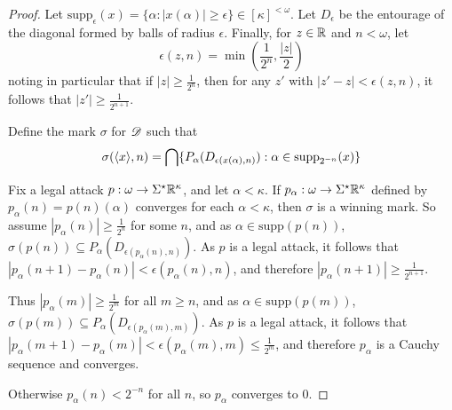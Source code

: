 \documentclass[11pt]{article}
\begin{document}
  \begin{proof}
    Let
    $
      \text{supp}_\epsilon(x)
        =
      \{\alpha:|x(\alpha)|\geq \epsilon\}
        \in
      [\kappa]^{<\omega}
    $. Let $D_\epsilon$ be the entourage of the diagonal formed by
    balls of radius $\epsilon$. Finally, for $z\in\mathbb{R}$
    and $n<\omega$, let
      \[
        \epsilon(z,n)
          =
        \min\left(
          \frac{1}{2^n},
          \frac{|z|}{2}
        \right)
      \]
    noting in particular that if $|z|\geq\frac{1}{2^n}$, then for any $z'$ with
    $|z'-z|<\epsilon(z,n)$, it follows that $|z'|\geq\frac{1}{2^{n+1}}$.

    Define the mark $\sigma$ for $\mathscr{D}$ such that
      \[
        \sigma(\langle x\rangle,n)
          =
        \bigcap\{
          P_\alpha(D_{\epsilon(x(\alpha),n)})
        :
          \alpha\in\text{supp}_{2^{-n}}(x)
        \}
      \]

    Fix a legal attack $p:\omega\to\Sigma^\star\mathbb{R}^{\kappa}$, and let
    $\alpha<\kappa$. If $p_\alpha:\omega\to\Sigma^\star\mathbb{R}^{\kappa}$ defined by
    $p_\alpha(n)=p(n)(\alpha)$ converges for each $\alpha<\kappa$,
    then $\sigma$ is a winning mark. So assume
    $|p_\alpha(n)|\geq\frac{1}{2^n}$ for some $n$,
    and as $\alpha\in\text{supp}(p(n))$,
    $\sigma(p(n))\subseteq P_\alpha(D_{\epsilon(p_\alpha(n),n)})$.
    As $p$ is a legal attack, it follows that
    $|p_\alpha(n+1)-p_\alpha(n)|<\epsilon(p_\alpha(n),n)$, and
    therefore $|p_\alpha(n+1)|\geq\frac{1}{2^{n+1}}$.

    Thus $|p_\alpha(m)|\geq\frac{1}{2^{m}}$ for all $m\geq n$,
    and as $\alpha\in\text{supp}(p(m))$,
    $\sigma(p(m))\subseteq P_\alpha(D_{\epsilon(p_\alpha(m),m)})$.
    As $p$ is a legal attack, it follows that
    $|p_\alpha(m+1)-p_\alpha(m)|<\epsilon(p_\alpha(m),m)\leq \frac{1}{2^m}$,
    and therefore $p_\alpha$ is a Cauchy sequence and converges.

    Otherwise $p_\alpha(n)<2^{-n}$ for all $n$, so $p_\alpha$ converges to $0$.
  \end{proof}
\end{document}
